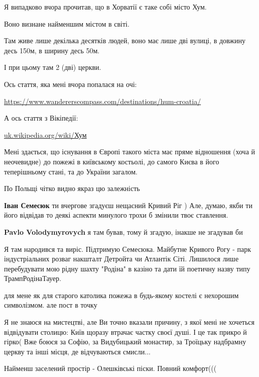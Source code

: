 \begin{itemize}

Я випадково вчора прочитав, що в Хорватії є таке собі місто Хум.

Воно визнане найменшим містом в світі.

Там живе лише декілька десятків людей, воно має лише дві вулиці, в довжину десь
150м, в ширину десь 50м.

І при цьому там 2 (дві) церкви.

Ось стаття, яка мені вчора попалася на очі:

\url{https://www.wandererscompass.com/destinations/hum-croatia/}

А ось стаття з Вікіпедії:

\url{uk.wikipedia.org/wiki/Хум}

Мені здається, що існування в Європі такого міста має пряме відношення (хоча й
неочевидне) до пожежі в київському костьолі, до самого Києва в його
теперішньому стані, та до України загалом.

По Польщі чітко видно якраз цю залежність

\textbf{Іван Семесюк} ти вчергове згадуєш нещасний Кривий Ріг )
Але, думаю, якби ти його відвідав то деякі аспекти минулого трохи б змінили твоє ставлення.

\begin{itemize} %
\textbf{Pavlo Volodymyrovych} я там бував, тому й згадую, інакше не згадував би

Я там народився та виріс. Підтримую Семесюка. Майбутне Кривого Рогу - парк індустріальних розваг накшталт Детройта чи Атлантік Сіті. Лишилося лише перебудувати мою рідну шахту "Родіна" в казіно та дати їй поетичну назву типу ТрампРодінаТауер.
\end{itemize} %

для мене як для старого католика пожежа в будь-якому костелі є нехорошим символізмом. але пост в точку


Я не знаюся на мистецтві, але Ви точно вказали причину, з якої мені не хочеться
відвідувати столицю: Київ щоразу втрачає частку своєї душі. І це так прикро й
гірко( Вже боюся за Софію, за Видубицький монастир, за Троїцьку надбрамну
церкву та інші місця, де відчуваються смисли...


Найменш заселений простір - Олешківські піски. Повний комфорт(((


\end{itemize}
